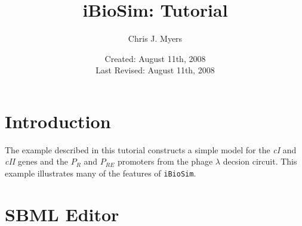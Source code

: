 \documentclass[titlepage,11pt]{article}
\title{iBioSim: Tutorial}
\author{Chris J. Myers}
\date{Created: August 11th, 2008\\
  Last Revised: August 11th, 2008
}
\begin{document}
\maketitle

  
\tableofcontents

\clearpage
  

\section{Introduction}

The example described in this tutorial constructs a simple model for
the \emph{cI} and \emph{cII} genes and the $P_R$ and $P_{RE}$
promoters from the phage $\lambda$ decsion circuit.  This example
illustrates many of the features of {\tt iBioSim}.


\section{SBML Editor}
\end{document}
